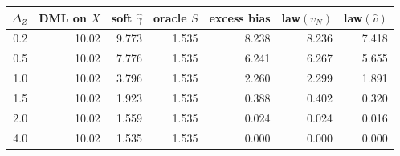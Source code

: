 \begin{tabular}{rrrrrrr}
\toprule
$\Delta_Z$ & DML on $X$ & soft $\hat\gamma$ & oracle $S$ & excess bias & law$(v_N)$ & law$(\hat v)$ \\
\midrule
0.2 & 10.02 & 9.773 & 1.535 & 8.238 & 8.236 & 7.418 \\
0.5 & 10.02 & 7.776 & 1.535 & 6.241 & 6.267 & 5.655 \\
1.0 & 10.02 & 3.796 & 1.535 & 2.260 & 2.299 & 1.891 \\
1.5 & 10.02 & 1.923 & 1.535 & 0.388 & 0.402 & 0.320 \\
2.0 & 10.02 & 1.559 & 1.535 & 0.024 & 0.024 & 0.016 \\
4.0 & 10.02 & 1.535 & 1.535 & 0.000 & 0.000 & 0.000 \\
\bottomrule
\end{tabular}